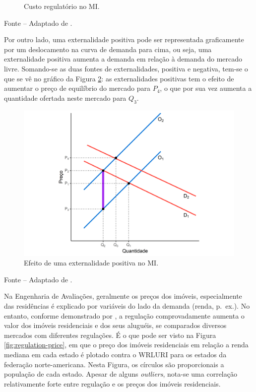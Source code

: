 \documentclass[
	12pt,				%
	oneside,			%
	a4paper,			%
	chapter=TITLE,		%
	section=TITLE,		%
	english,			%
	brazil				%
	]{abntex2}
\newcommand{\bcenter}{\begin{center}}
\newcommand{\ecenter}{\end{center}}
\begin{document}
\begin{refsection}
\begin{figure}[H]
{}

\caption{Custo regulatório no \gls{MI}.}\label{fig:externalities}
\end{figure}
\bcenter

\small Fonte -- Adaptado de \textcite[p.~211]{externalities}.
\ecenter

Por outro lado, uma externalidade positiva pode ser representada graficamente
por um deslocamento na curva de demanda para cima, ou seja, uma externalidade
positiva aumenta a demanda em relação à demanda do mercado livre. Somando-se as
duas fontes de externalidades, positiva e negativa, tem-se o que se vê no
gráfico da Figura \ref{fig:externalities1}: as externalidades positivas tem o
efeito de aumentar o preço de equilíbrio do mercado para \(P_4\), o que por sua
vez aumenta a quantidade ofertada neste mercado para \(Q_3\).
\begin{figure}[H]

{\centering \includegraphics[width=0.7\linewidth]{images/externalities1-1} 

}

\caption{Efeito de uma externalidade positiva no \gls{MI}.}\label{fig:externalities1}
\end{figure}
\bcenter

\small Fonte -- Adaptado de \textcite[p.~213]{externalities}.
\ecenter

Na Engenharia de Avaliações, geralmente os preços dos imóveis, especialmente das
residências é explicado por variáveis do lado da demanda (renda, p.~ex.). No
entanto, conforme demonstrado por \textcite{externalities}, a regulação comprovadamente
aumenta o valor dos imóveis residenciais e dos seus aluguéis, se comparados
diversos mercados com diferentes regulações. É o que pode ser visto na Figura
\ref{fig:regulation-price}, em que o preço dos imóveis residenciais em relação
a renda mediana em cada estado é plotado contra o \gls{WRLURI} para os estados
da federação norte-americana. Nesta Figura, os círculos são proporcionais a
população de cada estado. Apesar de alguns \emph{outliers}, nota-se uma correlação
relativamente forte entre regulação e os preços dos imóveis residenciais.


\end{refsection}
\end{document}
